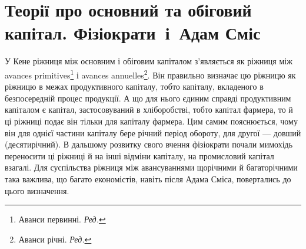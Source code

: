 
\section[%
Теорії про основний та обіговий капітал. Фізіократи~і~Адам Сміс
][%
Теорії про основний та обіговий капітал. Фізіократи~і~А. Сміс
]{Теорії про основний та обіговий капітал. Фізіократи~і~Адам Сміс}

У Кене ріжниця між основним і обіговим капіталом з’являється як
ріжниця між avances primitives\footnote*{
Аванси первинні. \emph{Ред.}
} і avances annuelles\footnote*{
Аванси річні. \emph{Ред.}
}. Він правильно визначає
цю ріжницю як ріжницю в межах продуктивного капіталу, тобто
капіталу, вкладеного в безпосередній процес продукції. А що для нього
єдиним справді продуктивним капіталом є капітал, застосовуваний в хліборобстві,
тобто капітал фармера, то й ці ріжниці подає він тільки для
капіталу фармера. Цим самим пояснюється, чому він для однієї частини
капіталу бере річний період обороту, для другої — довший (десятирічний).
В дальшому розвитку свого вчення фізіократи почали мимохідь переносити
ці ріжниці й на інші відміни капіталу, на промисловий капітал взагалі.
Для суспільства ріжниця між авансуваннями щорічними й багаторічними
така важлива, що багато економістів, навіть після Адама Сміса,
повертались до цього визначення.

